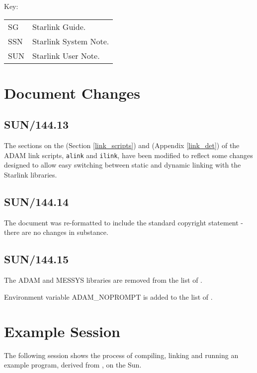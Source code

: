 \documentclass[twoside,11pt,nolof]{starlink}
\begin{document}
Key:
\begin{tabular}{ll}
SG & Starlink Guide.\\
SSN & Starlink System Note.\\
SUN & Starlink User Note.
\end{tabular}

\section{Document Changes}
\subsection{SUN/144.13}
The sections on the
 (Section \ref{link_scripts})
and
 (Appendix \ref{link_det})
of the ADAM link scripts, \texttt{alink} and \texttt{ilink}, have been modified
to reflect some changes designed to allow easy switching between static and
dynamic linking with the Starlink libraries.

\subsection{SUN/144.14}
The document was re-formatted to include the standard copyright statement -
there are no changes in substance.

\subsection{SUN/144.15}
The ADAM and MESSYS libraries are removed from the list of
.

Environment variable ADAM\_NOPROMPT is added to the list of
.
\newpage
\appendix
\section{Example Session}
The following session shows the process of compiling, linking and running an
example program, derived from
,
on the Sun.
\end{document}
